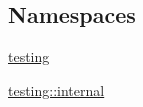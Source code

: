 \subsection*{Namespaces}
\begin{DoxyCompactItemize}
\item 
 \hyperlink{namespacetesting}{testing}
\item 
 \hyperlink{namespacetesting_1_1internal}{testing\+::internal}
\end{DoxyCompactItemize}
